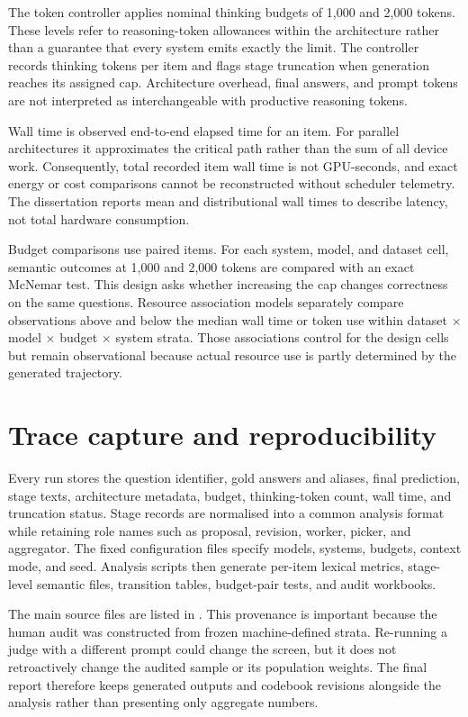 The token controller applies nominal thinking budgets of 1,000 and 2,000 tokens. These levels refer to reasoning-token allowances within the architecture rather than a guarantee that every system emits exactly the limit. The controller records thinking tokens per item and flags stage truncation when generation reaches its assigned cap. Architecture overhead, final answers, and prompt tokens are not interpreted as interchangeable with productive reasoning tokens.

Wall time is observed end-to-end elapsed time for an item. For parallel architectures it approximates the critical path rather than the sum of all device work. Consequently, total recorded item wall time is not GPU-seconds, and exact energy or cost comparisons cannot be reconstructed without scheduler telemetry. The dissertation reports mean and distributional wall times to describe latency, not total hardware consumption.

Budget comparisons use paired items. For each system, model, and dataset cell, semantic outcomes at 1,000 and 2,000 tokens are compared with an exact McNemar test. This design asks whether increasing the cap changes correctness on the same questions. Resource association models separately compare observations above and below the median wall time or token use within dataset $\times$ model $\times$ budget $\times$ system strata. Those associations control for the design cells but remain observational because actual resource use is partly determined by the generated trajectory.

\section{Trace capture and reproducibility}

Every run stores the question identifier, gold answers and aliases, final prediction, stage texts, architecture metadata, budget, thinking-token count, wall time, and truncation status. Stage records are normalised into a common analysis format while retaining role names such as proposal, revision, worker, picker, and aggregator. The fixed configuration files specify models, systems, budgets, context mode, and seed. Analysis scripts then generate per-item lexical metrics, stage-level semantic files, transition tables, budget-pair tests, and audit workbooks.

The main source files are listed in . This provenance is important because the human audit was constructed from frozen machine-defined strata. Re-running a judge with a different prompt could change the screen, but it does not retroactively change the audited sample or its population weights. The final report therefore keeps generated outputs and codebook revisions alongside the analysis rather than presenting only aggregate numbers.
